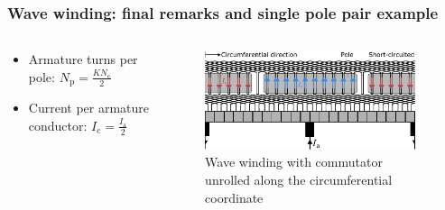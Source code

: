 \begin{frame}
	\frametitle{Wave winding: final remarks and single pole pair example}
	\begin{columns}
		\begin{column}{0.35\textwidth}
			\begin{itemize}
				\item Armature turns per pole: $N_\mathrm{p} = \frac{K N_\mathrm{c}}{2}$
				\item Current per armature conductor: $I_\mathrm{c} = \frac{I_\mathrm{a}}{2}$
			\end{itemize}
		\end{column}
		\hfill
		\begin{column}{0.65\textwidth}
			\begin{figure}
				\centering
				\includegraphics[width=0.95\textwidth]{fig/lec03/Wave_winding.pdf}
				\caption{Wave winding with commutator unrolled along the circumferential coordinate}
			\end{figure}
		\end{column}
	\end{columns}
\end{frame}

